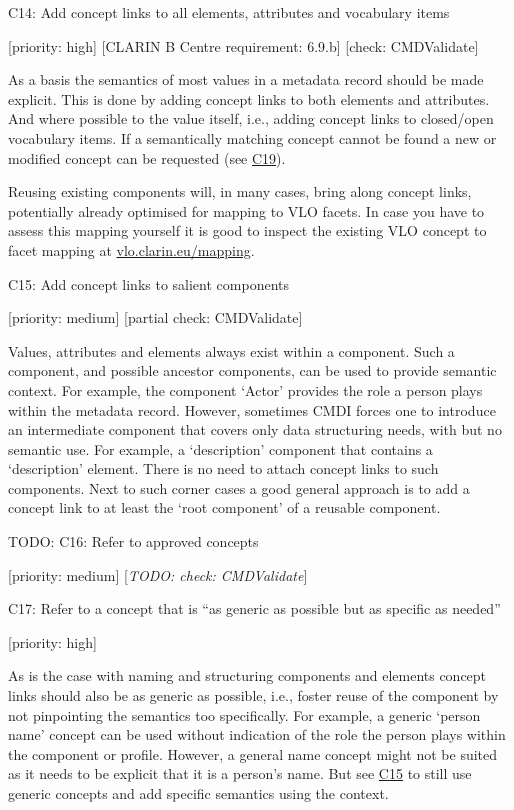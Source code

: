 \documentclass[]{article}
\begin{document}
C14: Add concept links to all elements, attributes and vocabulary items

{[}priority: high{]} {[}CLARIN B Centre requirement: 6.9.b{]} {[}check:
CMDValidate{]}

As a basis the semantics of most values in a metadata record should be
made explicit. This is done by adding concept links to both elements and
attributes. And where possible to the value itself, i.e., adding concept
links to closed/open vocabulary items. If a semantically matching
concept cannot be found a new or modified concept can be requested (see
\protect\hyperlink{c19}{C19}).

Reusing existing components will, in many cases, bring along concept
links, potentially already optimised for mapping to VLO facets. In case
you have to assess this mapping yourself it is good to inspect the
existing VLO concept to facet mapping at
\href{http://vlo.clarin.eu/mapping}{vlo.clarin.eu/mapping}.

C15: Add concept links to salient components

{[}priority: medium{]} {[}partial check: CMDValidate{]}

Values, attributes and elements always exist within a component. Such a
component, and possible ancestor components, can be used to provide
semantic context. For example, the component `Actor' provides the role a
person plays within the metadata record. However, sometimes CMDI forces
one to introduce an intermediate component that covers only data
structuring needs, with but no semantic use. For example, a
`description' component that contains a `description' element. There is
no need to attach concept links to such components. Next to such corner
cases a good general approach is to add a concept link to at least the
`root component' of a reusable component.

TODO: C16: Refer to approved concepts

{[}priority: medium{]} {[}\emph{TODO: check: CMDValidate}{]}

C17: Refer to a concept that is ``as generic as possible but as specific
as needed''

{[}priority: high{]}

As is the case with naming and structuring components and elements
concept links should also be as generic as possible, i.e., foster reuse
of the component by not pinpointing the semantics too specifically. For
example, a generic `person name' concept can be used without indication
of the role the person plays within the component or profile. However, a
general name concept might not be suited as it needs to be explicit that
it is a person's name. But see \protect\hyperlink{c15}{C15} to still use
generic concepts and add specific semantics using the context.
\end{document}

